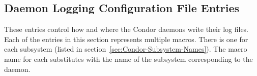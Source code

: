 
\subsection{\label{sec:Daemon-Logging-Config-File-Entries}Daemon Logging Configuration File Entries} 

These entries control how and where the Condor daemons write their log
files.  Each of the entries in this section represents multiple
macros. There is one for each subsystem (listed
in section~\ref{sec:Condor-Subsystem-Names}).
The macro name for each substitutes  with the name
of the subsystem corresponding to the daemon.
